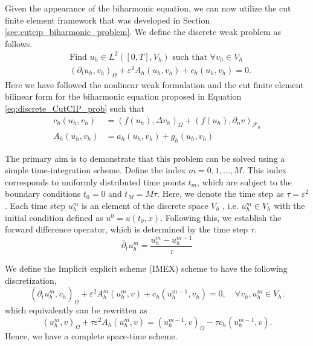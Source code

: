 \documentclass[11pt]{article}
\theoremstyle{remark}
\numberwithin{equation}{section}
\begin{document}
Given the appearance of the biharmonic equation, we can now utilize the cut finite element framework that was developed in Section \ref{sec:cutcip_biharmonic_problem}. We define the discrete weak problem as follows.
\begin{equation}
    \begin{split}
        & \text{Find  }u_{h} \in L^{2}( [0,T],V_{h})  \text{ such that } \forall v_{h} \in V_{h} \\
        & ( \partial_{t} u_{h},v_{h} )_{\Omega }   + \varepsilon^{2} A_{h}( u_{h},v_{h})   +  c_{h}( u_{h},v_{h})  = 0.
    \end{split}
\end{equation}
Here we have followed the nonlinear weak formulation \cite[Equation
4.2]{feng2007fully} and the cut finite element bilinear form for the biharmonic equation proposed in Equation \eqref{eq:discrete_CutCIP_prob} such that
\begin{align}
    c_{h}( u_{h}, v_{h})  & = ( f( u_{h}) ,\Delta v_{h})_{\Omega } +  ( f( u_{h}) , \partial _{n}v)_{\mathcal{F}_{h} } \\
    A_{h}( u_{h}, v_{h})  & =  a_{h}( u_{h}, v_{h}) + g_{h}( u_{h}, v_{h})
\end{align}

The primary aim is to demonstrate that this problem can be solved using a simple time-integration scheme. Define the index $m= 0, 1, \ldots, M$. This index corresponds to uniformly distributed time points $t_{m}$, which are subject to the
boundary conditions $t_{0} = 0$ and $t_{M} = M \tau$. Here, we denote the time step as $\tau = \varepsilon^2$. Each time step $u^{m}_{h}$ is an element of the discrete space $V_{h}$ , i.e. $u^{m}_{h} \in V_{h}$  with the initial condition defined as $u^{0} = u( t_{0},x )$. Following this, we establish the forward difference operator, which is determined by the time step $\tau $.
\begin{equation}
\overline{\partial } _{t} u_{h}^{m} = \frac{u_{h}^{m} - u_{h}^{m-1}}{ \tau }
\end{equation}

We define the Implicit explicit scheme (IMEX) scheme to have the following discretization,
\begin{equation}
( \overline{\partial } _{t} u^{m}_{h}, v_{h}   )_{\Omega } + \varepsilon^{2} A^{m}_{h}( u_{h}^{m} , v) +  c_{h} (  u_{h}^{m-1}, v_{h})  = 0 , \quad \forall v_{h}, u^{m}_{h} \in V^{}_{h}.
\end{equation}
which equivalently can be rewritten as
\begin{equation}
( u_{h}^{m},v )_{\Omega }  + \tau \varepsilon^{2} A_{h}( u_{h}^{m} , v)   =  ( u_{h}^{m-1},v )_{\Omega } - \tau c_{h} (  u_{h}^{m-1}, v) .
\end{equation}
Hence, we have a complete space-time scheme.
\end{document}
